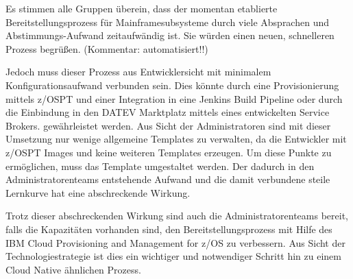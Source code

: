 Es stimmen alle Gruppen überein, dass der momentan etablierte Bereitstellungsprozess für Mainframesubsysteme durch viele Absprachen und Abstimmungs-Aufwand zeitaufwändig ist.
Sie würden einen neuen, schnelleren Prozess begrüßen. (Kommentar: automatisiert!!)

Jedoch muss dieser Prozess aus Entwicklersicht mit minimalem Konfigurationsaufwand verbunden sein.
Dies könnte durch eine Provisionierung mittels z/OSPT und einer  Integration in eine Jenkins Build Pipeline oder durch die Einbindung in den \glqq DATEV Marktplatz\grqq{} mittels eines entwickelten \glqq Service Brokers\grqq. gewährleistet werden.
Aus Sicht der Administratoren sind mit dieser Umsetzung nur wenige allgemeine Templates zu verwalten, da die Entwickler mit z/OSPT Images und keine weiteren Templates erzeugen.
Um diese Punkte zu ermöglichen, muss das Template umgestaltet werden.
Der dadurch in den Administratorenteams entstehende Aufwand und die damit verbundene steile Lernkurve hat eine abschreckende Wirkung.

Trotz dieser abschreckenden Wirkung sind auch die Administratorenteams bereit, falls die Kapazitäten vorhanden sind, den Bereitstellungsprozess mit Hilfe des \glqq IBM Cloud Provisioning and Management for z/OS\grqq{} zu verbessern.
Aus Sicht der Technologiestrategie ist dies ein wichtiger und notwendiger Schritt hin zu einem Cloud Native ähnlichen Prozess.
